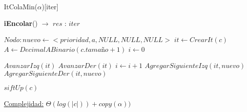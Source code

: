 \begin{Estructura}{ItColaMin($\alpha$)}[iter]
\begin{algorithm}[H]{\textbf{iEncolar}()  $\to$ $res$ : $iter$ }
    	\begin{algorithmic}[1]
			\State $Nodo: nuevo \leftarrow <prioridad, a, NULL, NULL, NULL> $ 				
			\State $it \leftarrow CrearIt(c)$ 
			\State $A \leftarrow DecimalABinario(c.tamaño + 1) $ 			
			\State $i \leftarrow 0$ 
									
			 			
				 
					\State $AvanzarIzq(it) $ 
				\Else
					\State $AvanzarDer(it) $ 
				\EndIf			
				\State $i \leftarrow i + 1$ 
			\EndWhile
			 
				\State $AgregarSiguienteIzq(it, nuevo)$ 
			\Else
				\State $AgregarSiguienteDer(it, nuevo)$ 
			\EndIf			

			\State $siftUp(c) $ 

			\medskip
			\Statex \underline{Complejidad:} $\Theta(log(|c|)) + copy(\alpha))$
    	\end{algorithmic}
\end{algorithm}
    	

\end{Estructura}
